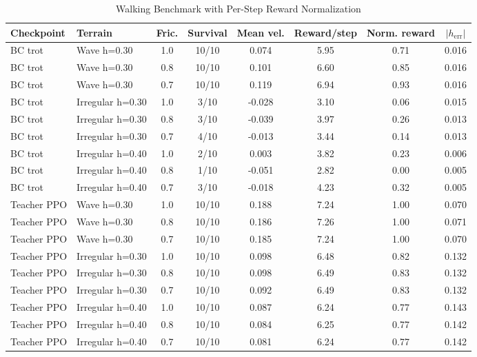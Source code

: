 \documentclass[conference]{IEEEtran}
\begin{document}
\begin{table}[htbp]
\caption{Walking Benchmark with Per-Step Reward Normalization}
\label{tab:walk-benchmark}
\centering
\scriptsize
\begin{tabular}{llcccccc}
\toprule
Checkpoint & Terrain & Fric. & Survival & Mean vel. & Reward/step & Norm. reward & $|h_{\mathrm{err}}|$ \\
\midrule
BC trot & Wave h=0.30 & 1.0 & 10/10 & 0.074 & 5.95 & 0.71 & 0.016 \\
BC trot & Wave h=0.30 & 0.8 & 10/10 & 0.101 & 6.60 & 0.85 & 0.016 \\
BC trot & Wave h=0.30 & 0.7 & 10/10 & 0.119 & 6.94 & 0.93 & 0.016 \\
BC trot & Irregular h=0.30 & 1.0 & 3/10 & -0.028 & 3.10 & 0.06 & 0.015 \\
BC trot & Irregular h=0.30 & 0.8 & 3/10 & -0.039 & 3.97 & 0.26 & 0.013 \\
BC trot & Irregular h=0.30 & 0.7 & 4/10 & -0.013 & 3.44 & 0.14 & 0.013 \\
BC trot & Irregular h=0.40 & 1.0 & 2/10 & 0.003 & 3.82 & 0.23 & 0.006 \\
BC trot & Irregular h=0.40 & 0.8 & 1/10 & -0.051 & 2.82 & 0.00 & 0.005 \\
BC trot & Irregular h=0.40 & 0.7 & 3/10 & -0.018 & 4.23 & 0.32 & 0.005 \\
\midrule
Teacher PPO & Wave h=0.30 & 1.0 & 10/10 & 0.188 & 7.24 & 1.00 & 0.070 \\
Teacher PPO & Wave h=0.30 & 0.8 & 10/10 & 0.186 & 7.26 & 1.00 & 0.071 \\
Teacher PPO & Wave h=0.30 & 0.7 & 10/10 & 0.185 & 7.24 & 1.00 & 0.070 \\
Teacher PPO & Irregular h=0.30 & 1.0 & 10/10 & 0.098 & 6.48 & 0.82 & 0.132 \\
Teacher PPO & Irregular h=0.30 & 0.8 & 10/10 & 0.098 & 6.49 & 0.83 & 0.132 \\
Teacher PPO & Irregular h=0.30 & 0.7 & 10/10 & 0.092 & 6.49 & 0.83 & 0.132 \\
Teacher PPO & Irregular h=0.40 & 1.0 & 10/10 & 0.087 & 6.24 & 0.77 & 0.143 \\
Teacher PPO & Irregular h=0.40 & 0.8 & 10/10 & 0.084 & 6.25 & 0.77 & 0.142 \\
Teacher PPO & Irregular h=0.40 & 0.7 & 10/10 & 0.081 & 6.24 & 0.77 & 0.142 \\
\bottomrule
\end{tabular}
\end{table}
\FloatBarrier
\end{document}
